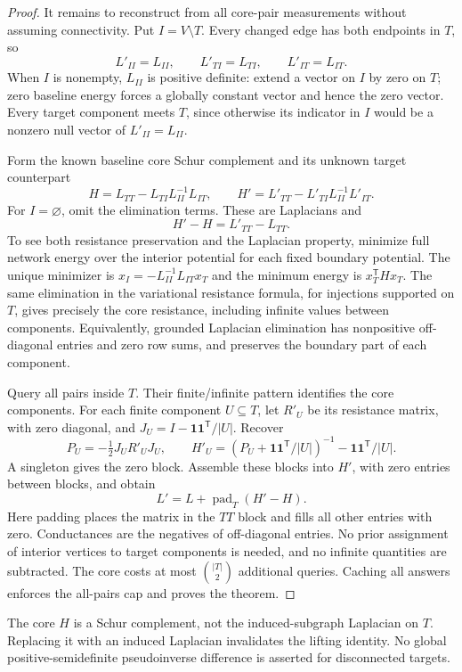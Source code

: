\documentclass[11pt,letterpaper]{article}
\newcommand{\one}{\mathbf 1}
\begin{document}
\begin{proof}
It remains to reconstruct from all core-pair measurements without assuming connectivity. Put $I=V\setminus T$. Every changed edge has both endpoints in $T$, so
\[
 L'_{II}=L_{II},\qquad L'_{TI}=L_{TI},\qquad L'_{IT}=L_{IT}.
\]
When $I$ is nonempty, $L_{II}$ is positive definite: extend a vector on $I$ by zero on $T$; zero baseline energy forces a globally constant vector and hence the zero vector. Every target component meets $T$, since otherwise its indicator in $I$ would be a nonzero null vector of $L'_{II}=L_{II}$.

Form the known baseline core Schur complement and its unknown target counterpart
\[
 H=L_{TT}-L_{TI}L_{II}^{-1}L_{IT},\qquad
 H'=L'_{TT}-L'_{TI}L_{II}^{-1}L'_{IT}.
\]
For $I=\varnothing$, omit the elimination terms. These are Laplacians and
\[
 H'-H=L'_{TT}-L_{TT}.
\]
To see both resistance preservation and the Laplacian property, minimize full network energy over the interior potential for each fixed boundary potential. The unique minimizer is $x_I=-L_{II}^{-1}L_{IT}x_T$ and the minimum energy is $x_T^{\mathsf T}Hx_T$. The same elimination in the variational resistance formula, for injections supported on $T$, gives precisely the core resistance, including infinite values between components. Equivalently, grounded Laplacian elimination has nonpositive off-diagonal entries and zero row sums, and preserves the boundary part of each component.

Query all pairs inside $T$. Their finite/infinite pattern identifies the core components. For each finite component $U\subseteq T$, let $R'_U$ be its resistance matrix, with zero diagonal, and $J_U=I-\one\one^{\mathsf T}/|U|$. Recover
\[
 P_U=-\tfrac12J_UR'_UJ_U,\qquad
 H'_U=(P_U+\one\one^{\mathsf T}/|U|)^{-1}-\one\one^{\mathsf T}/|U|.
\]
A singleton gives the zero block. Assemble these blocks into $H'$, with zero entries between blocks, and obtain
\[
 L'=L+\operatorname{pad}_T(H'-H).
\]
Here padding places the matrix in the $TT$ block and fills all other entries with zero. Conductances are the negatives of off-diagonal entries. No prior assignment of interior vertices to target components is needed, and no infinite quantities are subtracted. The core costs at most $\binom{|T|}2$ additional queries. Caching all answers enforces the all-pairs cap and proves the theorem.
\end{proof}

The core $H$ is a Schur complement, not the induced-subgraph Laplacian on $T$. Replacing it with an induced Laplacian invalidates the lifting identity. No global positive-semidefinite pseudoinverse difference is asserted for disconnected targets.
\end{document}
